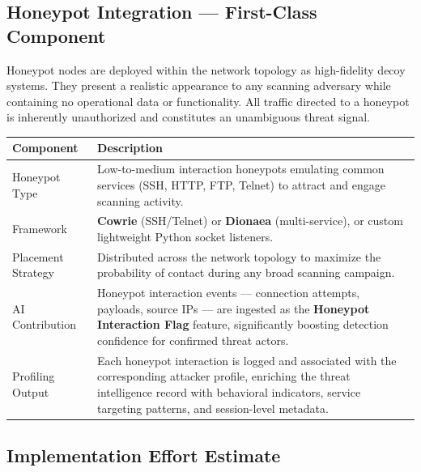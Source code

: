 \documentclass[12pt,a4paper]{article}
\begin{document}
\subsection{Honeypot Integration --- First-Class Component}

Honeypot nodes are deployed within the network topology as high-fidelity decoy
systems. They present a realistic appearance to any scanning adversary while
containing no operational data or functionality. All traffic directed to a
honeypot is inherently unauthorized and constitutes an unambiguous threat signal.

\begin{table}[h!]
\centering
\small
\begin{tabular}{L{3.5cm} L{11cm}}
  \toprule
  \textbf{Component} & \textbf{Description} \\
  \midrule
  Honeypot Type       & Low-to-medium interaction honeypots emulating common services
                        (SSH, HTTP, FTP, Telnet) to attract and engage scanning activity. \\
  Framework           & \textbf{Cowrie} (SSH/Telnet) or \textbf{Dionaea} (multi-service),
                        or custom lightweight Python socket listeners. \\
  Placement Strategy  & Distributed across the network topology to maximize the
                        probability of contact during any broad scanning campaign. \\
  AI Contribution     & Honeypot interaction events --- connection attempts, payloads,
                        source IPs --- are ingested as the \textbf{Honeypot Interaction
                        Flag} feature, significantly boosting detection confidence
                        for confirmed threat actors. \\
  Profiling Output    & Each honeypot interaction is logged and associated with the
                        corresponding attacker profile, enriching the threat intelligence
                        record with behavioral indicators, service targeting patterns,
                        and session-level metadata. \\
  \bottomrule
\end{tabular}
\end{table}

\subsection{Implementation Effort Estimate}
\end{document}
